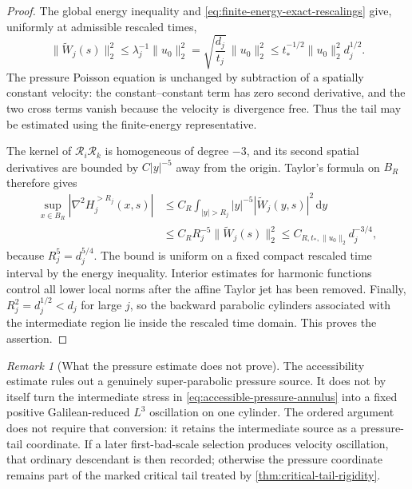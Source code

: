 \documentclass[11pt]{amsart}
\numberwithin{equation}{section}
\theoremstyle{plain}
\theoremstyle{definition}
\theoremstyle{remark}
\newtheorem{remark}[remark]{Remark}
\newcommand{\dd}{\,\mathrm d}
\begin{document}
\begin{proof}
The global energy inequality and \eqref{eq:finite-energy-exact-rescalings}
give, uniformly at admissible rescaled times,
\begin{equation}\label{eq:rescaled-energy-depth-bound}
 \|\widetilde W_j(s)\|_2^2
 \le\lambda_j^{-1}\|u_0\|_2^2
 =\sqrt{\frac{d_j}{t_j}}\,\|u_0\|_2^2
 \le t_*^{-1/2}\|u_0\|_2^2d_j^{1/2}.
\end{equation}
The pressure Poisson equation is unchanged by subtraction of a spatially
constant velocity: the constant--constant term has zero second derivative,
and the two cross terms vanish because the velocity is divergence free.
Thus the tail may be estimated using the finite-energy representative.

The kernel of \(\mathcal R_i\mathcal R_k\) is homogeneous of degree
\(-3\), and its second spatial derivatives are bounded by
\(C|y|^{-5}\) away from the origin.  Taylor's formula on \(B_R\) therefore
gives
\begin{align*}
 \sup_{x\in B_R}|\nabla^2H_j^{>R_j}(x,s)|
 &\le C_R\int_{|y|>R_j}|y|^{-5}
          |\widetilde W_j(y,s)|^2\dd y\\
 &\le C_RR_j^{-5}\|\widetilde W_j(s)\|_2^2
 \le C_{R,t_*,\|u_0\|_2}d_j^{-3/4},
\end{align*}
because \(R_j^5=d_j^{5/4}\).  The bound is uniform on a fixed compact
rescaled time interval by the energy inequality.  Interior estimates for
harmonic functions control all lower local norms after the affine Taylor jet
has been removed.  Finally, \(R_j^2=d_j^{1/2}<d_j\) for large \(j\), so
the backward parabolic cylinders associated with the intermediate region lie
inside the rescaled time domain.  This proves the assertion.
\end{proof}

\begin{remark}[What the pressure estimate does not prove]
The accessibility estimate rules out a genuinely super-parabolic pressure
source.  It does not by itself turn the intermediate stress in
\eqref{eq:accessible-pressure-annulus} into a fixed positive
Galilean-reduced \(L^3\) oscillation on one cylinder.  The ordered argument
does not require that conversion: it retains the intermediate source as a
pressure-tail coordinate.  If a later first-bad-scale selection produces
velocity oscillation, that ordinary descendant is then recorded; otherwise
the pressure coordinate remains part of the marked critical tail treated by
\cref{thm:critical-tail-rigidity}.
\end{remark}
\end{document}
